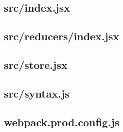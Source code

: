 \subsection{src/index.jsx}
\label{app:client_src_index_jsx}

\subsection{src/reducers/index.jsx}
\label{app:client_src_reducers_index_jsx}

\subsection{src/store.jsx}
\label{app:client_src_store_jsx}

\subsection{src/syntax.js}
\label{app:client_src_syntax_js}

\subsection{webpack.prod.config.js}
\label{app:client_webpack_prod_config_js}

